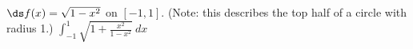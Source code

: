 {$\ds f(x) = \sqrt{1-x^2}$ on $[-1, 1]$. (Note: this describes the top half of a circle with radius 1.)}
{$\int_{-1}^1 \sqrt{1+\frac{x^2}{1-x^2}}\ dx$}
